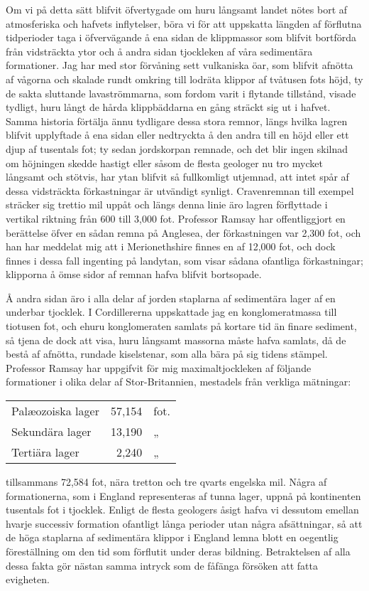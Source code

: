 Om vi på detta sätt blifvit öfvertygade om huru långsamt landet nötes bort af atmosferiska och hafvets inflytelser, böra vi för att uppskatta längden af förflutna tidperioder taga i öfvervägande å ena sidan de klippmassor som blifvit bortförda från vidsträckta ytor och å andra sidan tjockleken af våra sedimentära formationer. Jag har med stor förvåning sett vulkaniska öar, som blifvit afnötta af vågorna och skalade rundt omkring till lodräta klippor af tvåtusen fots höjd, ty de sakta sluttande lavaströmmarna, som fordom varit i flytande tillstånd, visade tydligt, huru långt de hårda klippbäddarna en gång sträckt sig ut i hafvet. Samma historia förtälja ännu tydligare dessa stora remnor, längs hvilka lagren blifvit upplyftade å ena sidan eller nedtryckta å den andra till en höjd eller ett djup af tusentals fot; ty sedan jordskorpan remnade, och det blir ingen skilnad om höjningen skedde hastigt eller såsom de flesta geologer nu tro mycket långsamt och stötvis, har ytan blifvit så fullkomligt utjemnad, att intet spår af dessa vidsträckta förkastningar är utvändigt synligt. Cravenremnan till exempel sträcker sig trettio mil uppåt och längs denna linie äro lagren förflyttade i vertikal riktning från 600 till 3,000 fot. Professor Ramsay har offentliggjort en berättelse öfver en sådan remna på Anglesea, der förkastningen var 2,300 fot, och han har meddelat mig att i Merionethshire finnes en af 12,000 fot, och dock finnes i dessa fall ingenting på landytan, som visar sådana ofantliga förkastningar; klipporna å ömse sidor af remnan hafva blifvit bortsopade.

Å andra sidan äro i alla delar af jorden staplarna af sedimentära lager af en underbar tjocklek. I Cordillererna uppskattade jag en konglomeratmassa till tiotusen fot, och ehuru konglomeraten samlats på kortare tid än finare sediment, så tjena de dock att visa, huru långsamt massorna måste hafva samlats, då de bestå af afnötta, rundade kiselstenar, som alla bära på sig tidens stämpel. Professor Ramsay har uppgifvit för mig maximaltjockleken af följande formationer i olika delar af Stor-Britannien, mestadels från verkliga mätningar:

\nopagebreak
\begin{tabular}{lrl}
Palæozoiska lager & 57,154 & fot. \\
Sekundära lager   & 13,190 &  „   \\
Tertiära lager    & 2,240  &  „
\end{tabular}

\noindent
tillsammans 72,584 fot, nära tretton och tre qvarts engelska mil. Några af formationerna, som i England representeras af tunna lager, uppnå på kontinenten tusentals fot i tjocklek. Enligt de flesta geologers åsigt hafva vi dessutom emellan hvarje successiv formation ofantligt långa perioder utan några afsättningar, så att de höga staplarna af sedimentära klippor i England lemna blott en oegentlig föreställning om den tid som förflutit under deras bildning. Betraktelsen af alla dessa fakta gör nästan samma intryck som de fåfänga försöken att fatta evigheten.

